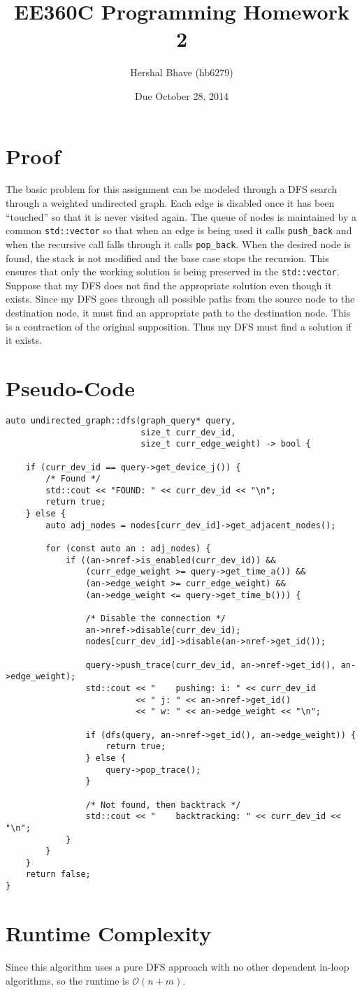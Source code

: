 \documentclass{article}
\title{EE360C Programming Homework 2}
\author{Hershal Bhave (hb6279)}
\date{Due October 28, 2014}
\begin{document}
\maketitle

\section{Proof}
The basic problem for this assignment can be modeled through a DFS
search through a weighted undirected graph. Each edge is disabled once
it has been ``touched'' so that it is never visited again. The queue
of nodes is maintained by a common \verb|std::vector| so that when an
edge is being used it calls \verb|push_back| and when the recursive
call falls through it calls \verb|pop_back|. When the desired node is
found, the stack is not modified and the base case stops the
recursion. This ensures that only the working solution is being
preserved in the \verb|std::vector|. Suppose that my DFS does not find
the appropriate solution even though it exists. Since my DFS goes
through all possible paths from the source node to the destination
node, it must find an appropriate path to the destination node. This
is a contraction of the original supposition. Thus my DFS must find a
solution if it exists.

\section{Pseudo-Code}
{\footnotesize
\begin{verbatim}
auto undirected_graph::dfs(graph_query* query,
                           size_t curr_dev_id,
                           size_t curr_edge_weight) -> bool {

    if (curr_dev_id == query->get_device_j()) {
        /* Found */
        std::cout << "FOUND: " << curr_dev_id << "\n";
        return true;
    } else {
        auto adj_nodes = nodes[curr_dev_id]->get_adjacent_nodes();

        for (const auto an : adj_nodes) {
            if ((an->nref->is_enabled(curr_dev_id)) &&
                (curr_edge_weight >= query->get_time_a()) &&
                (an->edge_weight >= curr_edge_weight) &&
                (an->edge_weight <= query->get_time_b())) {

                /* Disable the connection */
                an->nref->disable(curr_dev_id);
                nodes[curr_dev_id]->disable(an->nref->get_id());

                query->push_trace(curr_dev_id, an->nref->get_id(), an->edge_weight);
                std::cout << "    pushing: i: " << curr_dev_id
                          << " j: " << an->nref->get_id()
                          << " w: " << an->edge_weight << "\n";

                if (dfs(query, an->nref->get_id(), an->edge_weight)) {
                    return true;
                } else {
                    query->pop_trace();
                }

                /* Not found, then backtrack */
                std::cout << "    backtracking: " << curr_dev_id << "\n";
            }
        }
    }
    return false;
}
\end{verbatim}
}

\section{Runtime Complexity}
Since this algorithm uses a pure DFS approach with no other dependent
in-loop algorithms, so the runtime is $\mathcal{O}(n+m)$.
\end{document}
